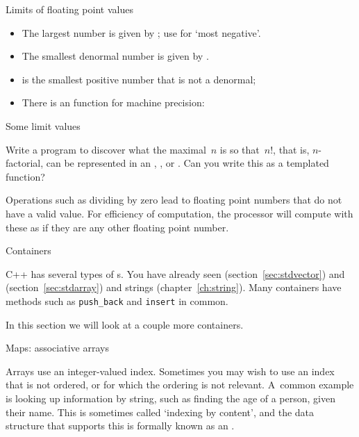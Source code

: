 \begin{block}{Limits of floating point values}
  \label{sl:float-limits}
  \begin{itemize}
  \item The largest number is given by ;
    use  for `most negative'.
  \item The smallest denormal number is given by .
  \item {} is the smallest positive number
    that is not a denormal;
  \item There is an  function for machine precision:
  \end{itemize}
\end{block}

\begin{block}{Some limit values}
  \label{sl:ieee-limits}
    \def\codesize{\ttfamily\scriptsize}
\end{block}

\begin{exercise}
  \label{ex:big-factorial}
  Write a program to discover what the maximal~$n$ is so that~$n!$,
  that is, $n$-factorial, can be represented in an , ,
  or . Can you write this as a templated function?
\end{exercise}

Operations such as dividing by zero lead to floating point numbers
that do not have a valid value. For efficiency of computation, the
processor will compute with these as if they are any other floating
point number.

 {Containers}

C++ has several types of s.
You have already seen 
(section~\ref{sec:stdvector})
and 
(section~\ref{sec:stdarray})
and strings (chapter~\ref{ch:string}).
Many containers have 
methods such as \lstinline{push_back} and \lstinline{insert} in common.

In this section we will look at a couple more containers.

 {Maps: associative arrays}
\label{sec:map}

Arrays use an integer-valued index. Sometimes you may wish to use an
index that is not ordered, or for which the ordering is not relevant.
A~common example is looking up information by string, such as finding
the age of a person, given their name. This is sometimes called
`indexing by content', and the data structure that supports this is
formally known as an .

